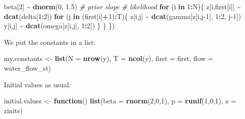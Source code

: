 \documentclass[
  12pt,
]{krantz}
\newenvironment{Shaded}{\begin{snugshade}}{\end{snugshade}}
\newcommand{\AttributeTok}[1]{\textcolor[rgb]{0.13,0.29,0.53}{#1}}
\newcommand{\CommentTok}[1]{\textcolor[rgb]{0.56,0.35,0.01}{\textit{#1}}}
\newcommand{\ControlFlowTok}[1]{\textcolor[rgb]{0.13,0.29,0.53}{\textbf{#1}}}
\newcommand{\DecValTok}[1]{\textcolor[rgb]{0.00,0.00,0.81}{#1}}
\newcommand{\FloatTok}[1]{\textcolor[rgb]{0.00,0.00,0.81}{#1}}
\newcommand{\FunctionTok}[1]{\textcolor[rgb]{0.13,0.29,0.53}{\textbf{#1}}}
\newcommand{\NormalTok}[1]{#1}
\newcommand{\OtherTok}[1]{\textcolor[rgb]{0.56,0.35,0.01}{#1}}
\newcommand{\SpecialCharTok}[1]{\textcolor[rgb]{0.81,0.36,0.00}{\textbf{#1}}}
\begin{document}
\begin{Shaded}
\begin{Highlighting}[]
\NormalTok{  beta[}\DecValTok{2}\NormalTok{] }\SpecialCharTok{\textasciitilde{}} \FunctionTok{dnorm}\NormalTok{(}\DecValTok{0}\NormalTok{, }\FloatTok{1.5}\NormalTok{) }\CommentTok{\# prior slope}
  \CommentTok{\# likelihood}
  \ControlFlowTok{for}\NormalTok{ (i }\ControlFlowTok{in} \DecValTok{1}\SpecialCharTok{:}\NormalTok{N)\{}
\NormalTok{    z[i,first[i]] }\SpecialCharTok{\textasciitilde{}} \FunctionTok{dcat}\NormalTok{(delta[}\DecValTok{1}\SpecialCharTok{:}\DecValTok{2}\NormalTok{])}
    \ControlFlowTok{for}\NormalTok{ (j }\ControlFlowTok{in}\NormalTok{ (first[i]}\SpecialCharTok{+}\DecValTok{1}\NormalTok{)}\SpecialCharTok{:}\NormalTok{T)\{}
\NormalTok{      z[i,j] }\SpecialCharTok{\textasciitilde{}} \FunctionTok{dcat}\NormalTok{(gamma[z[i,j}\DecValTok{{-}1}\NormalTok{], }\DecValTok{1}\SpecialCharTok{:}\DecValTok{2}\NormalTok{, j}\DecValTok{{-}1}\NormalTok{])}
\NormalTok{      y[i,j] }\SpecialCharTok{\textasciitilde{}} \FunctionTok{dcat}\NormalTok{(omega[z[i,j], }\DecValTok{1}\SpecialCharTok{:}\DecValTok{2}\NormalTok{])}
\NormalTok{    \}}
\NormalTok{  \}}
\NormalTok{\})}
\end{Highlighting}
\end{Shaded}

We put the constants in a list:

\begin{Shaded}
\begin{Highlighting}[]
\NormalTok{my.constants }\OtherTok{\textless{}{-}} \FunctionTok{list}\NormalTok{(}\AttributeTok{N =} \FunctionTok{nrow}\NormalTok{(y),}
                     \AttributeTok{T =} \FunctionTok{ncol}\NormalTok{(y),}
                     \AttributeTok{first =}\NormalTok{ first,}
                     \AttributeTok{flow =}\NormalTok{ water\_flow\_st)}
\end{Highlighting}
\end{Shaded}

Initial values as usual:

\begin{Shaded}
\begin{Highlighting}[]
\NormalTok{initial.values }\OtherTok{\textless{}{-}} \ControlFlowTok{function}\NormalTok{() }\FunctionTok{list}\NormalTok{(}\AttributeTok{beta =} \FunctionTok{rnorm}\NormalTok{(}\DecValTok{2}\NormalTok{,}\DecValTok{0}\NormalTok{,}\DecValTok{1}\NormalTok{),}
                                  \AttributeTok{p =} \FunctionTok{runif}\NormalTok{(}\DecValTok{1}\NormalTok{,}\DecValTok{0}\NormalTok{,}\DecValTok{1}\NormalTok{),}
                                  \AttributeTok{z =}\NormalTok{ zinits)}
\end{Highlighting}
\end{Shaded}
\end{document}
